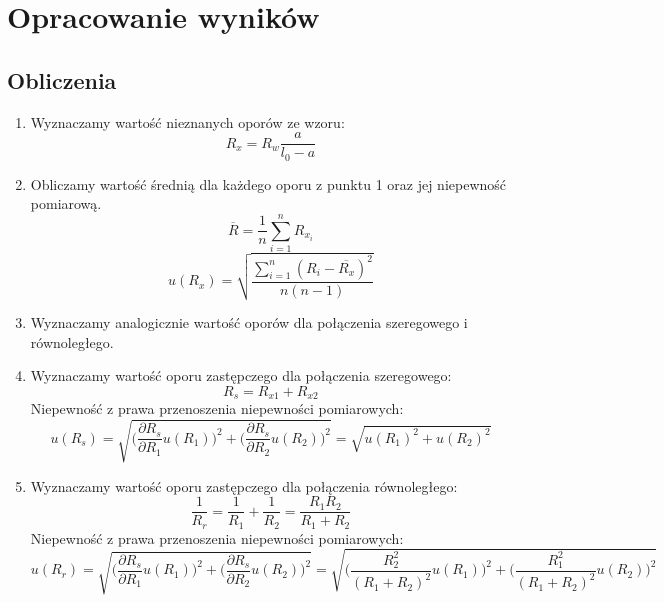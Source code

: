 \documentclass{article}
\begin{document}
\pagebreak
\section{Opracowanie wyników}
\subsection{Obliczenia}
\begin{enumerate}
	\item Wyznaczamy wartość nieznanych oporów ze wzoru:
	$$ R_{x} = R_{w}\frac{a}{l_{0}-a} $$
	\item Obliczamy wartość średnią dla każdego oporu z punktu 1 oraz jej niepewność pomiarową.
	$$ \overline{R} = \dfrac{1}{n}\sum_{i=1}^{n} R_{x_{i}} $$
	$$ u(R_{x}) = \sqrt{\frac{\sum_{i=1}^{n}(R_{i}-\overline{R_{x}})^2}{n(n-1)}}$$
	\item Wyznaczamy analogicznie wartość oporów dla połączenia szeregowego i równoległego.
	\item Wyznaczamy wartość oporu zastępczego dla połączenia szeregowego:
	$$ R_{s} = R_{x1}+R_{x2} $$
Niepewność z prawa przenoszenia niepewności pomiarowych:
$$ u(R_{s}) = \sqrt{\bigg(\frac{\partial R_{s}}{\partial R_{1}}u(R_{1})\bigg)^2+\bigg(\frac{\partial R_{s}}{\partial R_{2}}u(R_{2})\bigg)^2} = \sqrt{u(R_{1})^2+u(R_{2})^2}$$	
	
	\item Wyznaczamy wartość oporu zastępczego dla połączenia równoległego:
	$$ \frac{1}{R_{r}}=\frac{1}{R_{1}}+\frac{1}{R_{2}}=\frac{R_{1}R_{2}}{R_{1}+R_{2}}$$
Niepewność z prawa przenoszenia niepewności pomiarowych:
$$ u(R_{r}) = \sqrt{\bigg(\frac{\partial R_{s}}{\partial R_{1}}u(R_{1})\bigg)^2+\bigg(\frac{\partial R_{s}}{\partial R_{2}}u(R_{2})\bigg)^2} = \sqrt{\bigg(\frac{R_{2}^2}{(R_{1}+R_{2})^2}u(R_{1})\bigg)^2+\bigg(\frac{R_{1}^2}{(R_{1}+R_{2})^2}u(R_{2})\bigg)^2}$$	
\end{enumerate}
\end{document}
